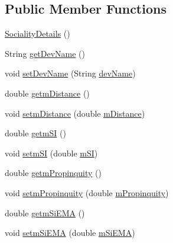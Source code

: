 \subsection*{Public Member Functions}
\begin{DoxyCompactItemize}
\item 
\hyperlink{classcs_1_1nsense_1_1inference_module_1_1_sociality_details_a31376ed8a33d67187e191a5bba7fdeef}{Sociality\-Details} ()
\item 
String \hyperlink{classcs_1_1nsense_1_1inference_module_1_1_sociality_details_a3cc14273d41323750ac04b272db73e1e}{get\-Dev\-Name} ()
\item 
void \hyperlink{classcs_1_1nsense_1_1inference_module_1_1_sociality_details_ae38eacb270bfce5b380cdca57b4f0398}{set\-Dev\-Name} (String \hyperlink{classcs_1_1nsense_1_1inference_module_1_1_sociality_details_ad7aef6760e509ff3665fd7e47cf05aad}{dev\-Name})
\item 
double \hyperlink{classcs_1_1nsense_1_1inference_module_1_1_sociality_details_a5a0774f6ea0b2d6361fd57908e66c41e}{getm\-Distance} ()
\item 
void \hyperlink{classcs_1_1nsense_1_1inference_module_1_1_sociality_details_a91f16c3f6a81300c09942c3d3df2abc6}{setm\-Distance} (double \hyperlink{classcs_1_1nsense_1_1inference_module_1_1_sociality_details_a0ec76e4ce159025388662ad6008c2a9e}{m\-Distance})
\item 
double \hyperlink{classcs_1_1nsense_1_1inference_module_1_1_sociality_details_a3860ab3fa1731734f989c45fae1fc0ad}{getm\-S\-I} ()
\item 
void \hyperlink{classcs_1_1nsense_1_1inference_module_1_1_sociality_details_a0d3a31e7b8f5e6e9e266b65ba4fef065}{setm\-S\-I} (double \hyperlink{classcs_1_1nsense_1_1inference_module_1_1_sociality_details_a0a174fb0173d3bb05af5a224af0dc1e1}{m\-S\-I})
\item 
double \hyperlink{classcs_1_1nsense_1_1inference_module_1_1_sociality_details_ad2b499df5a56b9334ac07668158454ad}{getm\-Propinquity} ()
\item 
void \hyperlink{classcs_1_1nsense_1_1inference_module_1_1_sociality_details_a5fe4b8c44db9e53007f013779d85a2ec}{setm\-Propinquity} (double \hyperlink{classcs_1_1nsense_1_1inference_module_1_1_sociality_details_af89d988e5ebf957e2fbdc430223bb670}{m\-Propinquity})
\item 
double \hyperlink{classcs_1_1nsense_1_1inference_module_1_1_sociality_details_aca00be89403348324a05ec8ae04c7fb4}{getm\-Si\-E\-M\-A} ()
\item 
void \hyperlink{classcs_1_1nsense_1_1inference_module_1_1_sociality_details_ae7d1fcf3e2df2cfc56321c5a37a11875}{setm\-Si\-E\-M\-A} (double \hyperlink{classcs_1_1nsense_1_1inference_module_1_1_sociality_details_a2174115bf6d09faef8cbbaca72bdd870}{m\-Si\-E\-M\-A})

\end{DoxyCompactItemize}
